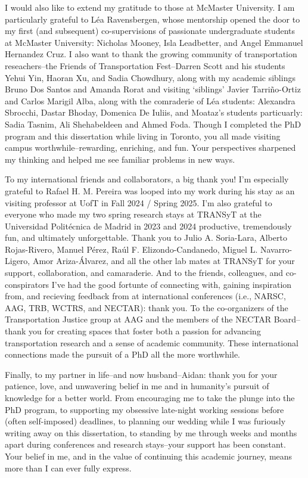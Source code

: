 \documentclass[
11pt, %
oneside, %
english, %
singlespacing, %
]{macthesis} %
\begin{document}
\begin{acknowledgements}
    I would also like to extend my gratitude to those at McMaster University. I am particularly grateful to Léa Ravensbergen, whose mentorship opened the door to my first (and subsequent) co-supervisions of passionate undergraduate students at McMaster University: Nicholas Mooney, Isla Leadbetter, and Angel Emmanuel Hernandez Cruz. I also want to thank the growing community of transportation reseachers--the Friends of Transportation Fest--Darren Scott and his students Yehui Yin, Haoran Xu, and Sadia Chowdhury, along with my academic siblings Bruno Dos Santos and Amanda Rorat and visiting `siblings' Javier Tarriño-Ortiz and Carlos Marigil Alba, along with the comraderie of Léa students: Alexandra Sbrocchi, Dastar Bhoday, Domenica De Iuliis, and Moataz's students particuarly: Sadia Tasnim, Ali Shehabeldeen and Ahmed Foda. Though I completed the PhD program and this dissertation while living in Toronto, you all made visiting campus worthwhile--rewarding, enriching, and fun. Your perspectives sharpened my thinking and helped me see familiar problems in new ways.

    To my international friends and collaborators, a big thank you! I'm especially grateful to Rafael H. M. Pereira was looped into my work during his stay as an visiting professor at UofT in Fall 2024 / Spring 2025. I'm also grateful to everyone who made my two spring research stays at TRANSyT at the Universidad Politécnica de Madrid in 2023 and 2024 productive, tremendously fun, and ultimately unforgettable. Thank you to Julio A. Soria-Lara, Alberto Rojas-Rivero, Manuel Pérez, Raúl F. Elizondo-Candanedo, Miguel L. Navarro-Ligero, Amor Ariza-Álvarez, and all the other lab mates at TRANSyT for your support, collaboration, and camaraderie. And to the friends, colleagues, and co-conspirators I've had the good fortunte of connecting with, gaining inspiration from, and recieving feedback from at international conferences (i.e., NARSC, AAG, TRB, WCTRS, and NECTAR): thank you. To the co-organizers of the Transportation Justice group at AAG and the members of the NECTAR Board--thank you for creating spaces that foster both a passion for advancing transportation research and a sense of academic community. These international connections made the pursuit of a PhD all the more worthwhile.

    Finally, to my partner in life--and now husband--Aidan: thank you for your patience, love, and unwavering belief in me and in humanity's pursuit of knowledge for a better world. From encouraging me to take the plunge into the PhD program, to supporting my obsessive late-night working sessions before (often self-imposed) deadlines, to planning our wedding while I was furiously writing away on this dissertation, to standing by me through weeks and months apart during conferences and research stays--your support has been constant. Your belief in me, and in the value of continuing this academic journey, means more than I can ever fully express.


\end{acknowledgements}
\end{document}
